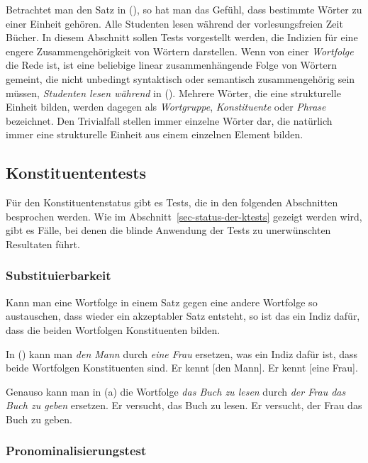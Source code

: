 Betrachtet man den Satz in (), so hat man das Gefühl, dass bestimmte Wörter zu einer
Einheit gehören.
\ea
Alle Studenten lesen während der vorlesungsfreien Zeit Bücher.
\z
In diesem Abschnitt sollen Tests vorgestellt werden, die Indizien für eine engere
Zusammengehörigkeit von Wörtern darstellen. Wenn von einer \emph{Wortfolge}
die Rede ist, ist eine beliebige linear zusammenhängende Folge von Wörtern gemeint, 
die nicht unbedingt syntaktisch oder semantisch zusammengehörig sein müssen, \zb
\emph{Studenten lesen während} in (). Mehrere Wörter, die eine strukturelle Einheit bilden,
werden dagegen als \emph{Wortgruppe}, \emph{Konstituente}
oder \emph{Phrase} bezeichnet. Den Trivialfall stellen immer einzelne Wörter dar, die
natürlich immer eine strukturelle Einheit aus einem einzelnen Element bilden.

\subsection{Konstituententests}

Für den Konstituentenstatus gibt es Tests, die in den folgenden Abschnitten besprochen werden.
Wie im Abschnitt~\ref{sec-status-der-ktests} gezeigt werden wird, gibt es Fälle, bei denen die
blinde Anwendung der Tests zu unerwünschten Resultaten führt.

\subsubsection{Substituierbarkeit}

Kann man eine Wortfolge %
in einem Satz gegen eine andere Wortfolge so austauschen, dass
wieder ein akzeptabler Satz entsteht, so ist das ein Indiz dafür, dass 
die beiden Wortfolgen Konstituenten bilden.

In () kann man \emph{den Mann} durch \emph{eine Frau} ersetzen, was ein Indiz dafür
ist, dass beide Wortfolgen Konstituenten sind.
\eal
\ex Er kennt [den Mann].
\ex Er kennt [eine Frau].
\zl

\noindent
Genauso kann man in (a) die Wortfolge \emph{das Buch zu lesen} durch
\emph{der Frau das Buch zu geben} ersetzen.
\eal
\ex Er versucht, das Buch zu lesen.\label{ex-das-buch-zu-lesen}
\ex Er versucht, der Frau das Buch zu geben.
\zl


\subsubsection{Pronominalisierungstest}

